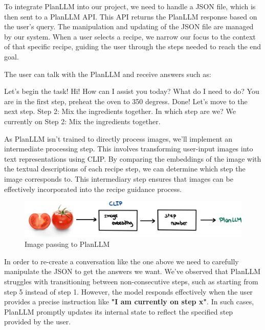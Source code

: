\documentclass[runningheads]{llncs}
\begin{document}
To integrate PlanLLM into our project, we need to handle a JSON file, which is then sent to a PlanLLM API. This API returns the PlanLLM response based on the user's query. The manipulation and updating of the JSON file are managed by our system. When a user selects a recipe, we narrow our focus to the context of that specific recipe, guiding the user through the steps needed to reach the end goal.

The user can talk with the PlanLLM and receive answers such as:\\[5pt]

\hspace{0.5cm} %
\begin{minipage}{1.2\textwidth} %
\begin{dialogue}
 Let's begin the task! 
 Hi! How can I assist you today? 
 What do I need to do?
 You are in the first step, preheat the oven to 350 degress.
 Done! Let's move to the next step.
 Step 2: Mix the ingredients together.
 In which step are we?
 We currently on Step 2: Mix the ingredients together.\\[5pt]
\end{dialogue}
\end{minipage}

As PlanLLM isn't trained to directly process images, we'll implement an intermediate processing step. This involves transforming user-input images into text representations using CLIP. By comparing the embeddings of the image with the textual descriptions of each recipe step, we can determine which step the image corresponds to. This intermediary step ensures that images can be effectively incorporated into the recipe guidance process.

\begin{figure}[!htbp]
    \center
    \includegraphics[scale=0.08]{images/planLLM.jpg}
    \caption{Image passing to PlanLLM}
\end{figure}

In order to re-create a conversation like the one above we need to carefully manipulate the JSON to get the answers we want. We've observed that PlanLLM struggles with transitioning between non-consecutive steps, such as starting from step 5 instead of step 1. However, the model responds effectively when the user provides a precise instruction like \textbf{"I am currently on step x"}. In such cases, PlanLLM promptly updates its internal state to reflect the specified step provided by the user.
\end{document}
